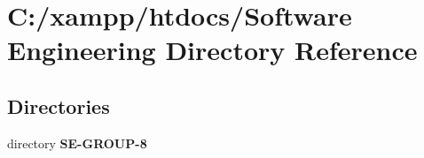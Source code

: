 \section{C\+:/xampp/htdocs/\+Software Engineering Directory Reference}
\label{dir_091e4a4dd5e0b4767b38e632310b848a}
\subsection*{Directories}
\begin{DoxyCompactItemize}
\item 
directory {\bf S\+E-\/\+G\+R\+O\+U\+P-\/8}
\end{DoxyCompactItemize}
